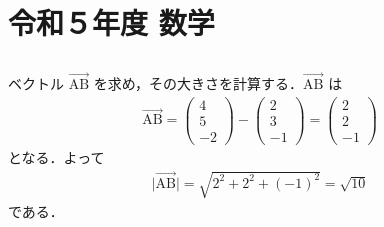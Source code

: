\section{令和５年度 数学}

\subsection{}

\subsubsection{}
ベクトル $\overrightarrow{\mathrm{AB}}$ を求め，その大きさを計算する．$\overrightarrow{\mathrm{AB}}$ は
\begin{align*}
  \overrightarrow{\mathrm{AB}} = \begin{pmatrix}4 \\ 5 \\ -2 \end{pmatrix} - \begin{pmatrix}2 \\ 3 \\ -1 \end{pmatrix} = \begin{pmatrix}2 \\ 2 \\ -1 \end{pmatrix}
\end{align*}
となる．よって
\begin{align*}
  \lvert\overrightarrow{\mathrm{AB}}\lvert = \sqrt{2^2 + 2^2 + (-1)^2} = \sqrt{10}
\end{align*}
である．


\subsubsection{}
\subsubsection{}
\subsubsection{}

\subsection{}

\subsection{}